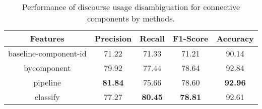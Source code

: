 \begin{table}[h]
\centering
\begin{tabular}{|c|c|c|c|c|}
\hline

\bf Features               & \bf Precision & \bf Recall & \bf F1-Score & \bf Accuracy \\ \hline
    baseline-component-id  &     71.22     &     71.33  &     71.21    &     90.14    \\ \hline
    bycomponent            &     79.92     &     77.44  &     78.64    &     92.84    \\ \hline
    pipeline               & \bf 81.84     &     75.66  &     78.60    & \bf 92.96    \\ \hline %
    classify               &     77.27     & \bf 80.45  & \bf 78.81    &     92.61    \\

\end{tabular}
\caption{\label{t:recognition-methods} Performance of discourse usage
disambiguation for connective components by methods. }
\end{table}
